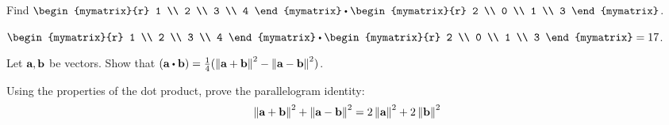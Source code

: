 \begin{ex}
  Find $\begin{mymatrix}{r}
    1 \\
    2 \\
    3 \\
    4
  \end{mymatrix} \dotprod \begin{mymatrix}{r}
    2 \\
    0 \\
    1 \\
    3
  \end{mymatrix}$.
  \begin{sol}
    $\begin{mymatrix}{r}
      1 \\
      2 \\
      3 \\
      4
    \end{mymatrix} \dotprod \begin{mymatrix}{r}
      2 \\
      0 \\
      1 \\
      3
    \end{mymatrix} = 17$.
  \end{sol}
\end{ex}

\begin{ex}
  Let $\vect{a},\vect{b}$ be vectors. Show that
  $(\vect{a}\dotprod \vect{b})
  = \frac{1}{4}(\norm{ \vect{a}+\vect{b}}^2
  - \norm{\vect{a}-\vect{b}}^2)$.
\end{ex}

\begin{ex}
  Using the properties of the dot product, prove the parallelogram
  identity:
  \begin{equation*}
    \norm{\vect{a}+\vect{b}}^2+\norm{\vect{a}-\vect{b}}^2
    = 2\norm{\vect{a}}^2+2\norm{\vect{b}}^2
  \end{equation*}
\end{ex}
